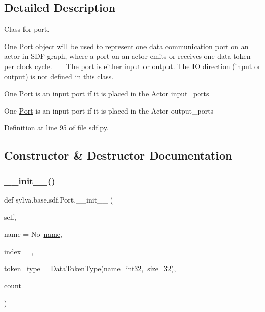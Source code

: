 \subsection{Detailed Description}
Class for port. 

One \hyperlink{classsylva_1_1base_1_1sdf_1_1_port}{Port} object will be used to represent one data communication port on an actor in S\+DF graph, where a port on an actor emits or receives one data token per clock cycle. ~\newline
~\newline
 The port is either input or output. The IO direction (input or output) is not defined in this class.


\begin{DoxyItemize}
\item One \hyperlink{classsylva_1_1base_1_1sdf_1_1_port}{Port} is an input port if it is placed in the Actor input\+\_\+ports
\item One \hyperlink{classsylva_1_1base_1_1sdf_1_1_port}{Port} is an input port if it is placed in the Actor output\+\_\+ports 
\end{DoxyItemize}

Definition at line 95 of file sdf.\+py.



\subsection{Constructor \& Destructor Documentation}
\mbox{\label{classsylva_1_1base_1_1sdf_1_1_port_a1c863910b4100f268b9193513b5d0963}} 
\subsubsection{\texorpdfstring{\+\_\+\+\_\+init\+\_\+\+\_\+()}{\_\_init\_\_()}}
{\footnotesize\ttfamily def sylva.\+base.\+sdf.\+Port.\+\_\+\+\_\+init\+\_\+\+\_\+ (\begin{DoxyParamCaption}\item[{}]{self,  }\item[{}]{name = {\ttfamily \textquotesingle{}No~\hyperlink{classsylva_1_1base_1_1sdf_1_1_port_aa8aa0ac5a7e375e2c0cb6e92a0b1dd20}{name}\textquotesingle{}},  }\item[{}]{index = {},  }\item[{}]{token\+\_\+type = {\ttfamily \hyperlink{classsylva_1_1base_1_1sdf_1_1_data_token_type}{Data\+Token\+Type}(\hyperlink{classsylva_1_1base_1_1sdf_1_1_port_aa8aa0ac5a7e375e2c0cb6e92a0b1dd20}{name}=\textquotesingle{}int32\textquotesingle{},~size=32)},  }\item[{}]{count = {} }\end{DoxyParamCaption})}



